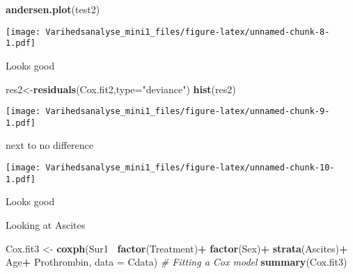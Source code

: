 \documentclass[
]{article}
\newenvironment{Shaded}{\begin{snugshade}}{\end{snugshade}}
\newcommand{\CommentTok}[1]{\textcolor[rgb]{0.56,0.35,0.01}{\textit{#1}}}
\newcommand{\DataTypeTok}[1]{\textcolor[rgb]{0.13,0.29,0.53}{#1}}
\newcommand{\KeywordTok}[1]{\textcolor[rgb]{0.13,0.29,0.53}{\textbf{#1}}}
\newcommand{\NormalTok}[1]{#1}
\newcommand{\OperatorTok}[1]{\textcolor[rgb]{0.81,0.36,0.00}{\textbf{#1}}}
\newcommand{\StringTok}[1]{\textcolor[rgb]{0.31,0.60,0.02}{#1}}
\begin{document}
\begin{Shaded}
\begin{Highlighting}[]
\KeywordTok{andersen.plot}\NormalTok{(test2)}
\end{Highlighting}
\end{Shaded}

\texttt{[image: Varihedsanalyse\_mini1\_files/figure-latex/unnamed-chunk-8-1.pdf]}

Looks good

\begin{Shaded}
\begin{Highlighting}[]
\NormalTok{res2<-}\KeywordTok{residuals}\NormalTok{(Cox.fit2,}\DataTypeTok{type=}\StringTok{"deviance"}\NormalTok{)}
\KeywordTok{hist}\NormalTok{(res2)}
\end{Highlighting}
\end{Shaded}

\texttt{[image: Varihedsanalyse\_mini1\_files/figure-latex/unnamed-chunk-9-1.pdf]}

next to no difference

\begin{Shaded}
\end{Shaded}

\texttt{[image: Varihedsanalyse\_mini1\_files/figure-latex/unnamed-chunk-10-1.pdf]}

Looks good

Looking at Ascites

\begin{Shaded}
\begin{Highlighting}[]
\NormalTok{Cox.fit3 <-}\StringTok{ }\KeywordTok{coxph}\NormalTok{(Sur1}\OperatorTok{~}\StringTok{ }\KeywordTok{factor}\NormalTok{(Treatment)}\OperatorTok{+}\StringTok{ }\KeywordTok{factor}\NormalTok{(Sex)}\OperatorTok{+}\StringTok{ }\KeywordTok{strata}\NormalTok{(Ascites)}\OperatorTok{+}\StringTok{ }\NormalTok{Age}\OperatorTok{+}\StringTok{ }\NormalTok{Prothrombin, }\DataTypeTok{data =}\NormalTok{ Cdata) }\CommentTok{# Fitting a Cox model}
\KeywordTok{summary}\NormalTok{(Cox.fit3)}
\end{Highlighting}
\end{Shaded}
\end{document}

